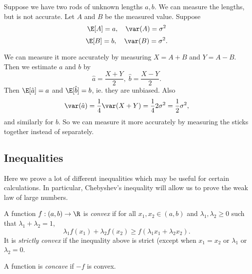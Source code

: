 \documentclass[a4paper]{article}
\begin{document}
\begin{eg}
  Suppose we have two rods of unknown lengths $a, b$. We can measure the lengths, but is not accurate. Let $A$ and $B$ be the measured value. Suppose
  \[
    \E[A] = a,\quad \var(A) = \sigma^2
  \]
  \[
    \E[B] = b, \quad \var(B) = \sigma^2.
  \]

  We can measure it more accurately by measuring $X = A + B$ and $Y = A - B$. Then we estimate $a$ and $b$ by
  \[
    \hat{a} = \frac{X + Y}{2},\; \hat{b} = \frac{X - Y}{2}.
  \]
  Then $\E[\hat{a}] = a$ and $\E[\hat{b}] = b$, ie. they are unbiased. Also
  \[
    \var (\hat{a}) = \frac{1}{4}\var(X + Y) = \frac{1}{4}2\sigma^2 = \frac{1}{2}\sigma^2,
  \]
  and similarly for $b$. So we can measure it more accurately by measuring the sticks together instead of separately.
\end{eg}

\subsection{Inequalities}
Here we prove a lot of different inequalities which may be useful for certain calculations. In particular, Chebyshev's inequality will allow us to prove the weak law of large numbers.

\begin{defi}
  A function $f: (a, b) \to \R$ is \emph{convex} if for all $x_1, x_2\in (a, b)$ and $\lambda_1, \lambda_2 \geq 0$ such that $\lambda_1 + \lambda_2 = 1$,\[
    \lambda_1f(x_1) + \lambda_2 f(x_2) \geq f(\lambda_1x_1 + \lambda_2 x_2).
  \]
  It is \emph{strictly convex} if the inequality above is strict (except when $x_1 = x_2$ or $\lambda_1$ or $\lambda_2 = 0$.

  \begin{center}
  \end{center}
  A function is \emph{concave} if $-f$ is convex.
\end{defi}
\end{document}
